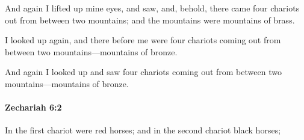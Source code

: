 			\begin{versebox}
					\item[BHS] 
					\item[LXX] 
					\item[ASV] And again I lifted up mine eyes, and saw, and, behold, there came four chariots out from between two mountains; and the mountains were mountains of brass.
					\item[NIV] I looked up again, and there before me were four chariots coming out from between two mountains—mountains of bronze.
					\item[NRSV] And again I looked up and saw four chariots coming out from between two mountains—mountains of bronze.
			\end{versebox}

		\paragraph{Zechariah 6:2} %
			\label{ZECHARIAH-6-2}

			In the first chariot were red horses; and in the second chariot black horses;

